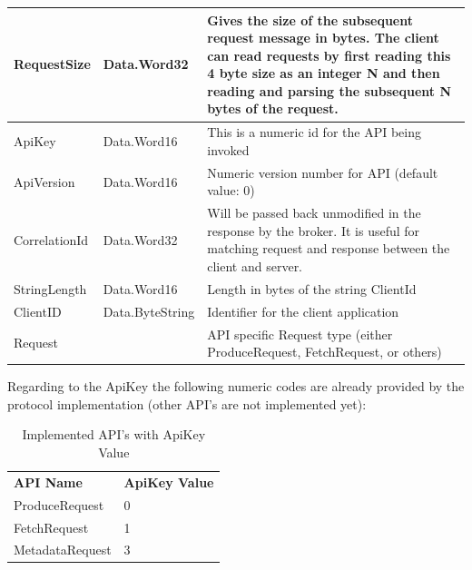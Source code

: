 \begin{table}[H]
\centering
\begin{tabular}{ l  l  p{10cm} }
\hline
RequestSize   & Data.Word32     & Gives the size of the subsequent request message in bytes. The client can read requests by first reading this 4 byte size as an integer N and then reading and parsing the subsequent N bytes of the request. \\ \hline
ApiKey        & Data.Word16     & This is a numeric id for the API being invoked                                                                                                                                                              \\ \hline
ApiVersion    & Data.Word16     & Numeric version number for API (default value: 0)                                                                                                                                                                          \\ \hline
CorrelationId & Data.Word32     & Will be passed back unmodified in the response by the broker. It is useful for matching request and response between the client and server.                                                                   \\ \hline
StringLength  & Data.Word16     & Length in bytes of the string ClientId                                                                                                                                                                          \\ \hline
ClientID      & Data.ByteString & Identifier for the client application                                                                                                                                                                         \\ \hline
Request       &                 & API specific Request type (either ProduceRequest, FetchRequest, or others)                                                                                                                                    \\ \hline
\end{tabular}
\end{table}

Regarding to the ApiKey the following numeric codes are already provided by the
protocol implementation (other API's are not implemented yet): 
\begin{table}[h]
    \centering
    \begin{tabular}{ll}
        {\bf API Name}  & {\bf ApiKey Value} \\
        ProduceRequest  & 0                  \\
        FetchRequest    & 1                  \\
        MetadataRequest & 3                 
    \end{tabular}
    \caption{Implemented API's with ApiKey Value}
\end{table}


